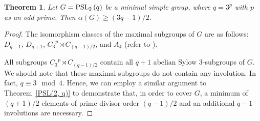 \documentclass{amsart}
\newtheorem{theorem}{Theorem}[section]
\theoremstyle{definition}
\theoremstyle{remark}
\begin{document}
\begin{theorem}\label{PSL(2, 3^p)}
Let $G=\operatorname{PSL}_{2}\left(q\right)$ be a minimal simple group, where $q=3^p$ with $p$ as an odd prime. Then $\alpha(G)\geq (3q-1)/2$.
\end{theorem}
\begin{proof} 
The isomorphism classes of the maximal subgroups of $G$ are as follows: $D_{q-1}$, $D_{q+1}$, ${C_3}^p\rtimes C_{(q-1)/2}$, and $A_4$ (refer to \cite[Theorem 2.2]{Giudici}).

All subgroups ${C_3}^p\rtimes C_{(q-1)/2}$ contain all $q+1$ abelian Sylow $3$-subgroups of $G$. We should note that these maximal subgroups do not contain any involution. In fact, $q\equiv 3 \mod 4$. Hence, we can employ a similar argument to Theorem~\ref{PSL(2, q)} to demonstrate that, in order to cover $G$, a minimum of $(q+1)/2$ elements of prime divisor order $(q-1)/2$ and an additional $q-1$ involutions are necessary.
\end{proof}
\end{document}
